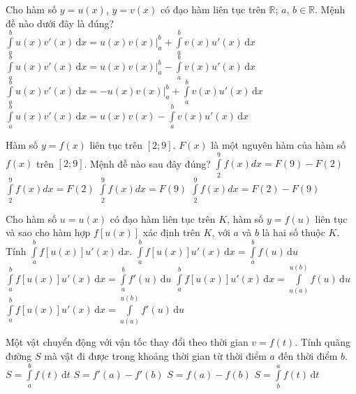 \begin{ex}%
	Cho hàm số $y=u(x)$, $y=v(x)$ có đạo hàm liên tục trên $\mathbb{R}$; $a$, $b\in \mathbb{R}$. Mệnh đề nào dưới đây là đúng?
	\choice
	{$\displaystyle \int\limits_a^b u(x)v'(x)\mathrm{\,d}x=u(x)v(x)\Bigg|_a^b+\displaystyle \int\limits_a^b v(x)u'(x)\mathrm{\,d}x $}
	{\True $\displaystyle \int\limits_a^b u(x)v'(x)\mathrm{\,d}x=u(x)v(x)\Bigg|_a^b-\displaystyle \int\limits_a^b v(x)u'(x)\mathrm{\,d}x $}
	{$\displaystyle \int\limits_a^b u(x)v'(x)\mathrm{\,d}x=-u(x)v(x)\Bigg|_a^b+\displaystyle \int\limits_a^b v(x)u'(x)\mathrm{\,d}x $}
	{$\displaystyle \int\limits_a^b u(x)v'(x)\mathrm{\,d}x=u(x)v(x)-\displaystyle \int\limits_a^b v(x)u'(x)\mathrm{\,d}x $}
\end{ex}
\begin{ex}%
	Hàm số $y=f(x)$ liên tục trên $\left[2; 9\right]$. $F(x)$ là một nguyên hàm của hàm số $f(x)$ trên $\left[2; 9\right]$. Mệnh đề nào sau đây đúng?
	\choice
	{\True $\displaystyle\int\limits_2^9f(x)dx=F(9)-F(2)$}
	{$\displaystyle\int\limits_2^9f(x)dx=F(2)$}
	{$\displaystyle\int\limits_2^9f(x)dx=F(9)$}
	{$\displaystyle\int\limits_2^9f(x)dx=F(2)-F(9)$}
\end{ex}
\begin{ex}%
	Cho hàm số $u=u(x)$ có đạo hàm liên tục trên $K$, hàm số $y=f(u)$ liên tục và sao cho hàm hợp $f[u(x)]$ xác định trên $K$, với $a$ và $b$ là hai số thuộc $K$. Tính $\displaystyle \int\limits_a^bf[u(x)]u'(x)\mathrm{\,d}x$.
	\choice
	{$\displaystyle \int\limits_a^bf[u(x)]u'(x)\mathrm{\,d}x=\displaystyle \int\limits_a^bf(u)\mathrm{\,d}u $}
	{$\displaystyle \int\limits_a^bf[u(x)]u'(x)\mathrm{\,d}x=\displaystyle \int\limits_a^bf'(u)\mathrm{\,d}u $}
	{\True $\displaystyle \int\limits_a^bf[u(x)]u'(x)\mathrm{\,d}x=\displaystyle \int\limits_{u(a)}^{u(b)}f(u)\mathrm{\,d}u $}
	{$\displaystyle \int\limits_a^bf[u(x)]u'(x)\mathrm{\,d}x=\displaystyle \int\limits_{u(a)}^{u(b)}f'(u)\mathrm{\,d}u $}
\end{ex}
\begin{ex}%
	Một vật chuyển động với vận tốc thay đổi theo thời gian $v=f(t)$. Tính quãng đường $S$ mà vật đi được trong khoảng thời gian từ thời điểm $a$ đến thời điểm $b$.
	\choice
	{\True $S=\displaystyle \int\limits_a^b f(t)\mathrm{\,d}t $}
	{$S=f'(a)-f'(b) $}
	{$S=f(a)-f(b) $}
	{$S=\displaystyle \int\limits_b^a f(t)\mathrm{\,d}t $}
\end{ex}

